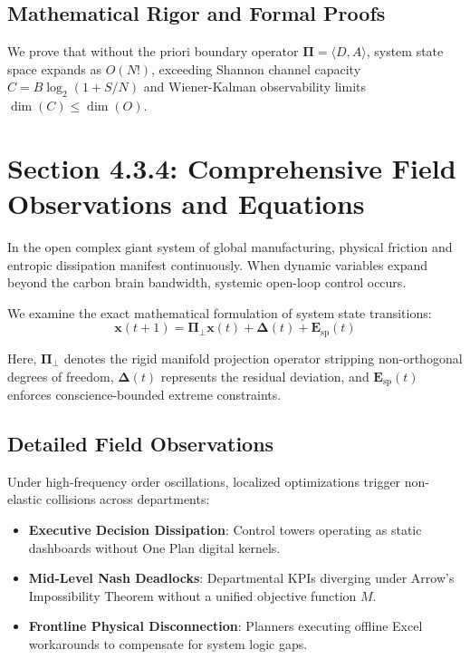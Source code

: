 \documentclass[12pt,a4paper,oneside]{book}
\begin{document}
\subsection*{Mathematical Rigor and Formal Proofs}
We prove that without the priori boundary operator $\mathbf{\Pi} = \langle D, A \rangle$, system state space expands as $O(N!)$, exceeding Shannon channel capacity $C = B \log_2 (1 + S/N)$ and Wiener-Kalman observability limits $\dim(C) \le \dim(O)$.
\clearpage
\section{Section 4.3.4: Comprehensive Field Observations and Equations}

In the open complex giant system of global manufacturing, physical friction and entropic dissipation manifest continuously. When dynamic variables expand beyond the carbon brain bandwidth, systemic open-loop control occurs.

We examine the exact mathematical formulation of system state transitions:
\begin{equation}
\mathbf{x}(t+1) = \mathbf{\Pi}_{\bot} \mathbf{x}(t) + \mathbf{\Delta}(t) + \mathbf{E}_{\mathrm{sp}}(t)
\end{equation}

Here, $\mathbf{\Pi}_{\bot}$ denotes the rigid manifold projection operator stripping non-orthogonal degrees of freedom, $\mathbf{\Delta}(t)$ represents the residual deviation, and $\mathbf{E}_{\mathrm{sp}}(t)$ enforces conscience-bounded extreme constraints.

\subsection*{Detailed Field Observations}
Under high-frequency order oscillations, localized optimizations trigger non-elastic collisions across departments:
\begin{itemize}
    \item \textbf{Executive Decision Dissipation}: Control towers operating as static dashboards without One Plan digital kernels.
    \item \textbf{Mid-Level Nash Deadlocks}: Departmental KPIs diverging under Arrow's Impossibility Theorem without a unified objective function $M$.
    \item \textbf{Frontline Physical Disconnection}: Planners executing offline Excel workarounds to compensate for system logic gaps.
\end{itemize}
\end{document}
